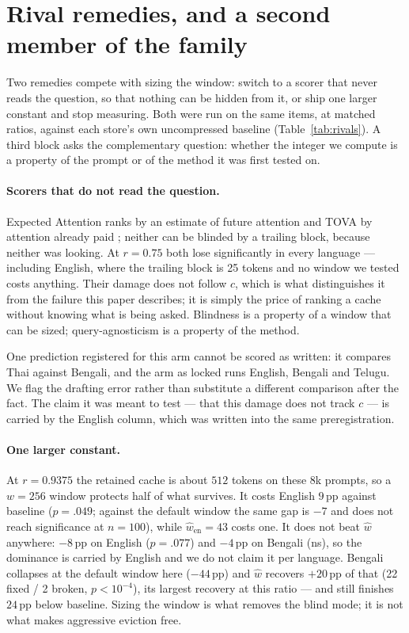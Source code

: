 \documentclass{article}
\begin{document}
\section{Rival remedies, and a second member of the family}
\label{app:rivals}

Two remedies compete with sizing the window: switch to a scorer that
never reads the question, so that nothing can be hidden from it, or ship
one larger constant and stop measuring. Both were run on the same items,
at matched ratios, against each store's own uncompressed baseline
(Table~\ref{tab:rivals}). A third block asks the complementary question:
whether the integer we compute is a property of the prompt or of the
method it was first tested on.

\paragraph{Scorers that do not read the question.}
Expected Attention ranks by an estimate of future attention
\citep{devoto2025expected} and TOVA by attention already paid
\citep{oren2024transformers}; neither can be blinded by a trailing block,
because neither was looking. At $r{=}0.75$ both lose significantly in
every language --- including English, where the trailing block is 25
tokens and no window we tested costs anything. Their damage does not
follow $c$, which is what distinguishes it from the failure this paper
describes; it is simply the price of ranking a cache without knowing what
is being asked. Blindness is a property of a window that can be sized;
query-agnosticism is a property of the method.

One prediction registered for this arm cannot be scored as written: it
compares Thai against Bengali, and the arm as locked runs English,
Bengali and Telugu. We flag the drafting error rather than substitute a
different comparison after the fact. The claim it was meant to test ---
that this damage does not track $c$ --- is carried by the English column,
which was written into the same preregistration.

\paragraph{One larger constant.}
At $r{=}0.9375$ the retained cache is about $512$ tokens on these 8k
prompts, so a $w{=}256$ window protects half of what survives. It costs
English $9$\,pp against baseline ($p{=}.049$; against the default window
the same gap is $-7$ and does not reach significance at $n{=}100$), while
$\hat w_{\text{en}}{=}43$ costs one. It does not beat $\hat w$ anywhere:
$-8$\,pp on English ($p{=}.077$) and $-4$\,pp on Bengali (ns), so the
dominance is carried by English and we do not claim it per language.
Bengali collapses at the default window here ($-44$\,pp) and $\hat w$
recovers $+20$\,pp of that (22 fixed / 2 broken, $p{<}10^{-4}$), its
largest recovery at this ratio --- and still finishes $24$\,pp below
baseline. Sizing the window is what removes the blind mode; it is not
what makes aggressive eviction free.
\end{document}
